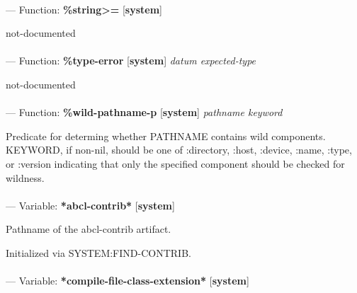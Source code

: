 \paragraph{}
\label{SYSTEM:STRING>=}
--- Function: \textbf{\%string>=} [\textbf{system}] \textit{}

\begin{adjustwidth}{5em}{5em}
not-documented
\end{adjustwidth}

\paragraph{}
\label{SYSTEM:TYPE-ERROR}
--- Function: \textbf{\%type-error} [\textbf{system}] \textit{datum expected-type}

\begin{adjustwidth}{5em}{5em}
not-documented
\end{adjustwidth}

\paragraph{}
\label{SYSTEM:WILD-PATHNAME-P}
--- Function: \textbf{\%wild-pathname-p} [\textbf{system}] \textit{pathname keyword}

\begin{adjustwidth}{5em}{5em}
Predicate for determing whether PATHNAME contains wild components.
KEYWORD, if non-nil, should be one of :directory, :host, :device,
:name, :type, or :version indicating that only the specified component
should be checked for wildness.
\end{adjustwidth}

\paragraph{}
\label{SYSTEM:*ABCL-CONTRIB*}
--- Variable: \textbf{*abcl-contrib*} [\textbf{system}] \textit{}

\begin{adjustwidth}{5em}{5em}
Pathname of the abcl-contrib artifact.

Initialized via SYSTEM:FIND-CONTRIB.
\end{adjustwidth}

\paragraph{}
\label{SYSTEM:*COMPILE-FILE-CLASS-EXTENSION*}
--- Variable: \textbf{*compile-file-class-extension*} [\textbf{system}] \textit{}

